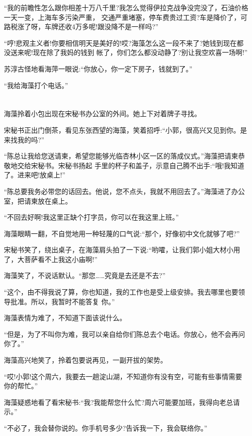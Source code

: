 \documentclass[11pt,a4paper,onecolumn]{article}
\begin{document}
``我的前瞻性怎么跟你相差十万八千里?我怎么觉得伊拉克战争没完没了，石油价格一天一变，上海车多污染严重，
交通严重堵塞，停车费贵过工资?车是降价了，可路税涨了呀，车牌还收4万多呢!跟没降不是一样吗?''

``哼!悲观主义者!你要相信明天是美好的!哎?海藻怎么这一段不来了?她钱到现在都没送来呢!现在除了我妈的钱到
帐了，你们怎么都没动静了?别让我空欢喜一场啊!''

苏淳古怪地看海萍一眼说:``你放心，你一定下房子，钱就到了。''

``我给海藻打个电话。''

\section[\thesection]{}

海藻拎着小包出现在宋秘书办公室的外间。她上下对着牌子寻找。

宋秘书正出门倒茶，看见东张西望的海藻，笑着招呼:``小郭，很高兴又见到你。是来找我的吗?''

``陈总让我给您送请柬，希望您能够光临杏林小区一区的落成仪式。''海藻把请柬恭敬地交给宋秘书。宋秘书扬起
手里的杯子和盖子，示意自己腾不出手:``哦!我知道了。进来吧!放桌上!''

``陈总要我务必带您的话回去。他说，您不点头，我就不用回去了。''海藻进了办公室，把请柬放在桌上。

``不回去好啊!我这里正缺个打字员，你可以在我这里上班。''

海藻眼睛一翻，不自觉地用一种轻蔑的口气说:``那个，好像初中文化就够了吧?''

宋秘书笑了，绕出桌子，在海藻肩头拍了一下说:``哟嚯，让我们郭小姐大材小用了，大菩萨看不上我这小庙啊!''

海藻笑了，不说话默认。``那您……究竟是去还是不去?''

``这个，由不得我说了算，你也知道，我的工作也是受上级安排。我去哪里也要领导批准。所以，我暂时不能答复
你。''

海藻表情为难了，不知道下面该说什么。

``但是，为了不叫你为难，我可以亲自给你们陈总去个电话。你放心，他不会再问你了。''

海藻高兴地笑了，拎着包要说再见，一副开拔的架势。

``哎!小郭!这个周六，我要去一趟淀山湖，不知道你有没有空，可能有些事情需要你的帮忙。''

海藻疑惑地看了看宋秘书:``我?我能帮您什么忙?周六可能要加班，我得向老总请示。''

``不必了，我会替你说的。你手机号多少?告诉我一下，我会联络你。''
\end{document}
